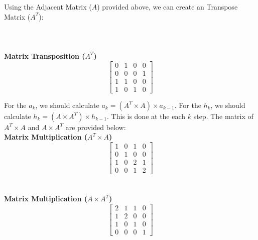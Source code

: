 \documentclass[paper=8.27in:11.69in, 14pt, DIV=calc]{scrartcl}
\begin{document}
Using the Adjacent Matrix ($A$) provided above, we can create an Transpose Matrix ($A^T$):\\
\\
\\
\textbf{\\Matrix Transposition ($A^T$)}\\
\[\begin{bmatrix}
0                & 1                & 0                & 0               \\
0                & 0                & 0                & 1               \\
1                & 1                & 0                & 0               \\
1                & 0                & 1                & 0              
\end{bmatrix}\]

For the $a_{k}$, we should calculate $a_{k} = (A^{T} \times A) \times a_{k-1}$. For the $h_{k}$, we should calculate $h_{k} = (A \times A^{T}) \times h_{k-1}$. This is done at the each $k$ step. The matrix of $A^{T} \times A$ and $A \times A^{T}$ are provided below:\\


\textbf{Matrix Multiplication ($A^{T} \times A$)} \\
\[\begin{bmatrix}
1                 & 0                 & 1                 & 0                 \\
0                 & 1                 & 0                 & 0                 \\
1                 & 0                 & 2                 & 1                 \\
0                 & 0                 & 1                 & 2                
\end{bmatrix}\]
\\
\\

\textbf{Matrix Multiplication ($A \times A^{T}$)} \\
\[\begin{bmatrix}
2                 & 1                 & 1                 & 0  \\
1                 & 2                 & 0                 & 0  \\
1                 & 0                 & 1                 & 0  \\
0                 & 0                 & 0                 & 1  
\end{bmatrix}\]
\end{document}
